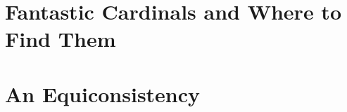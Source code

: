 




\frontmatter





\setcounter{tocdepth}{2}
\tableofcontents
\thispagestyle{fancy}






\mainmatter

\newpage\part{Fantastic Cardinals and Where to Find Them}





\newpage\part{An Equiconsistency}








\appendix


\backmatter
\pagestyle{fancy}

\nocite{*}




